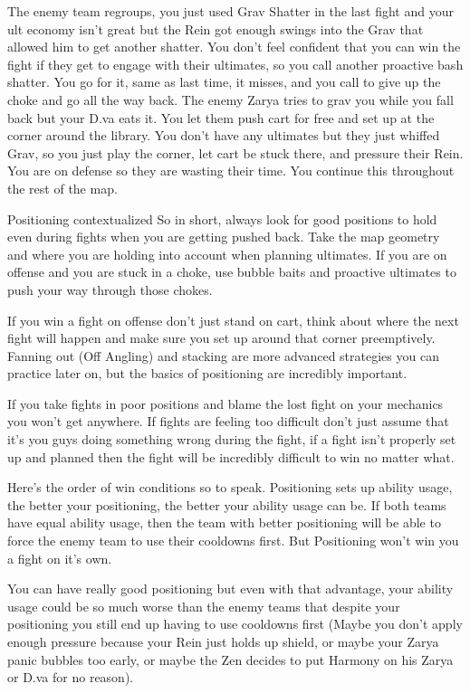 The enemy team regroups, you just used Grav Shatter in the last fight and your ult economy isn’t great but the Rein got enough swings into the Grav that allowed him to get another shatter. You don’t feel confident that you can win the fight if they get to engage with their ultimates, so you call another proactive bash shatter. You go for it, same as last time, it misses, and you call to give up the choke and go all the way back.
The enemy Zarya tries to grav you while you fall back but your D.va eats it. You let them push cart for free and set up at the corner around the library. You don’t have any ultimates but they just whiffed Grav, so you just play the corner, let cart be stuck there, and pressure their Rein. You are on defense so they are wasting their time. You continue this throughout the rest of the map.

Positioning contextualized
So in short, always look for good positions to hold even during fights when you are getting pushed back. Take the map geometry and where you are holding into account when planning ultimates. If you are on offense and you are stuck in a choke, use bubble baits and proactive ultimates to push your way through those chokes.

If you win a fight on offense don’t just stand on cart, think about where the next fight will happen and make sure you set up around that corner preemptively. Fanning out (Off Angling) and stacking are more advanced strategies you can practice later on, but the basics of positioning are incredibly important.

If you take fights in poor positions and blame the lost fight on your mechanics you won’t get anywhere. If fights are feeling too difficult don’t just assume that it’s you guys doing something wrong during the fight, if a fight isn’t properly set up and planned then the fight will be incredibly difficult to win no matter what. 

Here’s the order of win conditions so to speak. Positioning sets up ability usage, the better your positioning, the better your ability usage can be. If both teams have equal ability usage, then the team with better positioning will be able to force the enemy team to use their cooldowns first. But Positioning won’t win you a fight on it’s own.


You can have really good positioning but even with that advantage, your ability usage could be so much worse than the enemy teams that despite your positioning you still end up having to use cooldowns first (Maybe you don’t apply enough pressure because your Rein just holds up shield, or maybe your Zarya panic bubbles too early, or maybe the Zen decides to put Harmony on his Zarya or D.va for no reason).

